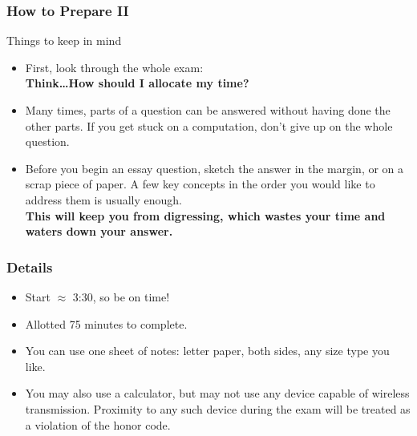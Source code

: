 \documentclass[9pt]{beamer}
\begin{document}

\begin{frame}[t]
\frametitle{How to Prepare II}
Things to keep in mind
\medskip
\begin{itemize}
\item First, look through the whole exam: \\
\medskip
\textbf{Think\ldots How should I allocate my time?}
\medskip
\item Many times, parts of a question can be answered without having done
the other parts. If you get stuck on a computation, don't give up on the whole
question.
\medskip
\item Before you begin an essay question, sketch the answer in the margin, or on a scrap
piece of paper. A few key concepts in the order you would like to address them is usually
enough.\\
\medskip
 \textbf{This will keep you from digressing, which wastes your time and waters down
your answer.}\\
\end{itemize}
\bigskip
\end{frame}


\begin{frame}[t]
\frametitle{Details}
\bigskip
\begin{itemize}
\item Start $\approx$ 3:30, so be on time!
\bigskip
\item Allotted 75 minutes to complete.
\bigskip
\item You can use one sheet of notes: letter paper, both sides, any size type you like.
\bigskip
\item You may also use a calculator, but may not use any device capable of wireless transmission. Proximity to any such device during the exam will be treated as a violation of the honor
code.
\bigskip
\end{itemize}
\bigskip
\end{frame}
\end{document}
